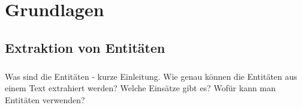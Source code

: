 \chapter{Grundlagen}
\label{sec:Grundlagen}

\section{Extraktion von Entitäten}
\paragraph{}
Was sind die Entitäten - kurze Einleitung. Wie genau können die Entitäten aus einem Text extrahiert werden? Welche Einsätze gibt es? Wofür kann man Entitäten verwenden?


